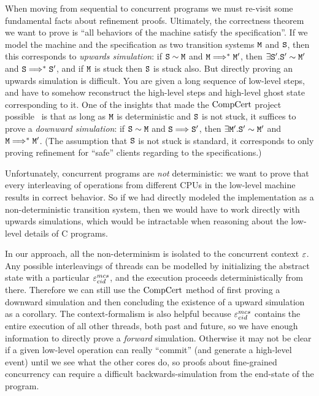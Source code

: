 When moving from sequential to concurrent programs we must
re-visit some fundamental facts about refinement proofs.  Ultimately,
the correctness theorem we want to prove is ``all behaviors of the
machine satisfy the specification''. If we model the machine and the
specification as two transition systems ${\mathrm{\texttt{M}}}$ and ${\mathrm{\texttt{S}}}$, then this
corresponds to \emph{upwards simulation}: if ${\mathrm{\texttt{S}}} \sim {\mathrm{\texttt{M}}}$ and 
${\mathrm{\texttt{M}}} \Longrightarrow^* {\mathrm{\texttt{M}}}'$, then $\exists {\mathrm{\texttt{S}}}'. {\mathrm{\texttt{S}}}' \sim {\mathrm{\texttt{M}}}'$ and
 ${\mathrm{\texttt{S}}} \Longrightarrow^* {\mathrm{\texttt{S}}}'$, and if ${\mathrm{\texttt{M}}}$ is stuck then ${\mathrm{\texttt{S}}}$ is stuck also.
But directly proving an upwards simulation is difficult. You are given
a long sequence of low-level steps, and have to somehow reconstruct
the high-level steps and high-level ghost state corresponding to
it. One of the insights that made the $\mathrm{CompCert}$ project
possible~\cite{Leroy-backend} is that as long as ${\mathrm{\texttt{M}}}$ is deterministic
and ${\mathrm{\texttt{S}}}$ is not stuck, it suffices to prove a \emph{downward
  simulation}: if ${\mathrm{\texttt{S}}} \sim {\mathrm{\texttt{M}}}$ and ${\mathrm{\texttt{S}}} \Longrightarrow {\mathrm{\texttt{S}}}'$, then $\exists
{\mathrm{\texttt{M}}}'. {\mathrm{\texttt{S}}}' \sim {\mathrm{\texttt{M}}}'$ and ${\mathrm{\texttt{M}}} \Longrightarrow^* {\mathrm{\texttt{M}}}'$. (The assumption that ${\mathrm{\texttt{S}}}$
is not stuck is standard, it corresponds to only proving refinement
for ``safe'' clients regarding to the specifications.)

Unfortunately, concurrent programs are \emph{not} deterministic: we
want to prove that every interleaving of operations from
different CPUs in the low-level machine results in correct
behavior. So if we had directly modeled the implementation as a
non-deterministic transition system, then we would have to work
directly with upwards simulations, which would be intractable when
reasoning about the low-level details of C programs.

In our approach, all the non-determinism is isolated to the concurrent
context ${\varepsilon}$. Any possible interleavings of  threads can be
modelled by initializing the abstract state with a particular
${\varepsilon}^{mcs}_{cid}$, and the execution proceeds deterministically from
there. Therefore we can still use the $\mathrm{CompCert}$ method of first
proving a downward simulation and then concluding the existence of a
upward simulation as a corollary.
The context-formalism is also helpful because ${\varepsilon}^{mcs}_{cid}$ contains
the entire execution of all other threads, both past and future, so we
have enough information to directly prove a \emph{forward}
simulation. Otherwise it may not be clear if a given low-level
operation can really ``commit'' (and generate a high-level event)
until we see what the other cores do, so proofs about fine-grained
concurrency can require a difficult backwards-simulation
from the end-state of the program.~\cite{DGLMQueue}

